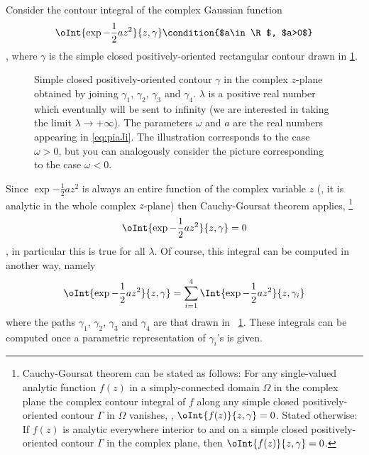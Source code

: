 Consider  the contour integral of the complex Gaussian function
\begin{dmath*}%
   \oInt{\exp{-\frac{1}{2}az^{2}}}{z, \gamma} \condition{$a\in \R$, $a>0$}
\end{dmath*},
where $\gamma$ is the simple closed positively-oriented rectangular contour drawn in
\cref{fig:gamma}.
\begin{figure}
\centering
{}
\caption{Simple closed positively-oriented contour $\gamma$ in the complex
   $z$-plane obtained by joining $\gamma_{1}$, $\gamma_{2}$, $\gamma_{3}$ and
   $\gamma_{4}$. $\lambda$ is a positive real number which eventually will be sent
   to infinity (we are interested in taking the limit
   $\lambda\rightarrow+\infty$).
   The parameters
   $\omega$ and $a$ are the real numbers appearing in \cref{eq:piaJi}. The
   illustration corresponds to the case $\omega>0$, but you can analogously
   consider the 
   picture corresponding to the case $\omega<0$. 
\label{fig:gamma}}
\end{figure}
Since $\exp{-\frac{1}{2}az^{2}}$ is always an entire function of the complex variable $z$ (\ie,
it is analytic in the whole complex $z$-plane) then 
Cauchy-Goursat theorem applies,%
\footnote{Cauchy-Goursat theorem can be stated as follows: 
For any single-valued
analytic function $f(z)$ in a simply-connected domain $\Omega$  in the complex
plane the complex contour integral of $f$ along any simple closed positively-oriented contour
$\Gamma$ in $\Omega$ vanishes, \ie, $\oInt{f(z) }{z,\gamma}= 0$. 
Stated otherwise: If $f(z)$  is analytic everywhere interior to and on a simple
closed positively-oriented contour $\Gamma$ in the complex plane, then
$\oInt{f(z)}{z,\gamma} =0 $.%
}
\begin{dmath}[label={int=0}]
   \oInt{\exp{-\frac{1}{2}az^{2}}}{z,\gamma}=0
\end{dmath},
in particular this is true for all $\lambda$.
Of course, this integral can be computed in another way,  namely
\begin{dmath}[label={int=sum4}]
   \oInt{\exp{-\frac{1}{2}az^{2}}}{z,\gamma} = \sum_{i=1}^{4} \Int{
      \exp{-\frac{1}{2}az^{2}}}{z,\gamma_{i}} 
\end{dmath}
where the paths $\gamma_{1}$, $\gamma_{2}$, $\gamma_{3}$ and $\gamma_{4}$ are
that drawn in \figurename~\ref{fig:gamma}.
These integrals can be computed once a parametric representation of
$\gamma_{i}$'s is given. 

